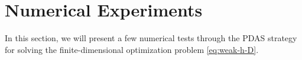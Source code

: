 \documentclass[smallextended]{svjour3}
\numberwithin{equation}{section}
\numberwithin{figure}{section}
\numberwithin{table}{section}
\begin{document}



	\section{Numerical Experiments} \label{sec:numer}

    In this section, we will present a few numerical tests through the PDAS strategy \cite{troltzsch10} for solving the finite-dimensional optimization problem \eqref{eq:weak-h-D}. 
\end{document}
